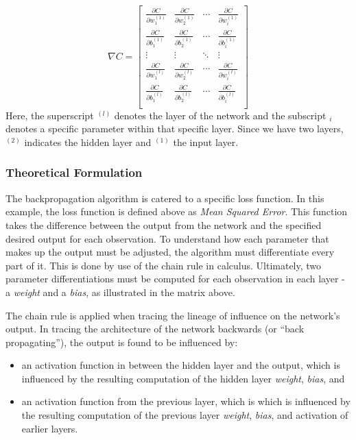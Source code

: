\documentclass[
]{article}
\providecommand{\tightlist}{%
  \setlength{\itemsep}{0pt}\setlength{\parskip}{0pt}}
\begin{document}
\[
\nabla{C} =
\begin{bmatrix}
\frac{\partial{C}}{\partial{w_1^{(1)}}} & \frac{\partial{C}}{\partial{w_2^{(1)}}} & \cdots & 
\frac{\partial{C}}{\partial{w_i^{(1)}}} \\
\frac{\partial{C}}{\partial{b_1^{(1)}}} & \frac{\partial{C}}{\partial{b_2^{(1)}}} & \cdots & 
\frac{\partial{C}}{\partial{b_i^{(1)}}} \\
\vdots & \vdots & \ddots & \vdots \\
\frac{\partial{C}}{\partial{w_1^{(l)}}} & \frac{\partial{C}}{\partial{w_2^{(l)}}} & \cdots & 
\frac{\partial{C}}{\partial{w_i^{(l)}}} \\
\frac{\partial{C}}{\partial{b_1^{(l)}}} & \frac{\partial{C}}{\partial{b_2^{(l)}}} & \cdots & 
\frac{\partial{C}}{\partial{b_i^{(l)}}} \\
\end{bmatrix}
\] Here, the superscript \(^{(l)}\) denotes the layer of the network and
the subscript \(_i\) denotes a specific parameter within that specific
layer. Since we have two layers, \(^{(2)}\) indicates the hidden layer
and \(^{(1)}\) the input layer.

\hypertarget{theoretical-formulation}{%
\subsubsection{Theoretical Formulation}\label{theoretical-formulation}}

The backpropagation algorithm is catered to a specific loss function. In
this example, the loss function is defined above as \emph{Mean Squared
Error}. This function takes the difference between the output from the
network and the specified desired output for each observation. To
understand how each parameter that makes up the output must be adjusted,
the algorithm must differentiate every part of it. This is done by use
of the chain rule in calculus. Ultimately, two parameter
differentiations must be computed for each observation in each layer - a
\emph{weight} and a \emph{bias}, as illustrated in the matrix above.

The chain rule is applied when tracing the lineage of influence on the
network's output. In tracing the architecture of the network backwards
(or ``back propagating''), the output is found to be influenced by:

\begin{itemize}
\tightlist
\item
  an activation function in between the hidden layer and the output,
  which is influenced by the resulting computation of the hidden layer
  \emph{weight}, \emph{bias}, and
\item
  an activation function from the previous layer, which is which is
  influenced by the resulting computation of the previous layer
  \emph{weight}, \emph{bias}, and activation of earlier layers.
\end{itemize}
\end{document}
